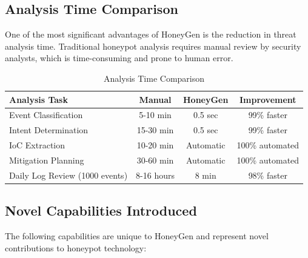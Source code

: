 \documentclass[12pt,a4paper]{report}
\begin{document}
\subsection{Analysis Time Comparison}

One of the most significant advantages of HoneyGen is the reduction in threat analysis time. Traditional honeypot analysis requires manual review by security analysts, which is time-consuming and prone to human error.

\begin{table}[h]
\centering
\caption{Analysis Time Comparison}
\label{tab:time_comparison}
\begin{tabular}{|l|c|c|c|}
\hline
\textbf{Analysis Task} & \textbf{Manual} & \textbf{HoneyGen} & \textbf{Improvement} \\
\hline
Event Classification & 5-10 min & 0.5 sec & 99\% faster \\
\hline
Intent Determination & 15-30 min & 0.5 sec & 99\% faster \\
\hline
IoC Extraction & 10-20 min & Automatic & 100\% automated \\
\hline
Mitigation Planning & 30-60 min & Automatic & 100\% automated \\
\hline
Daily Log Review (1000 events) & 8-16 hours & 8 min & 98\% faster \\
\hline
\end{tabular}
\end{table}

\subsection{Novel Capabilities Introduced}

The following capabilities are unique to HoneyGen and represent novel contributions to honeypot technology:
\end{document}
